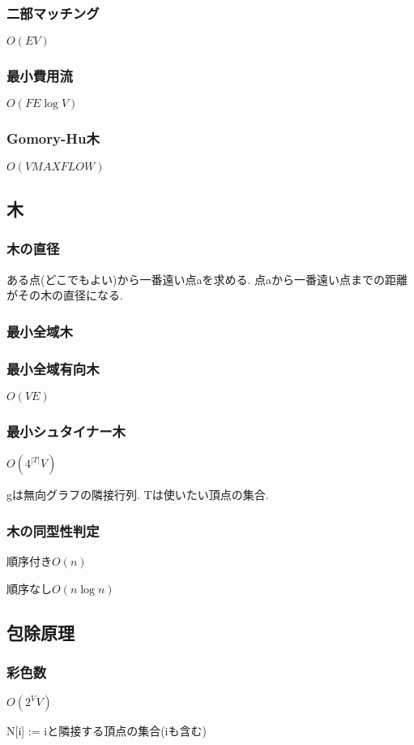 \subsubsection{二部マッチング}
$O(EV)$\par


\subsubsection{最小費用流}
$O(FE\log V)$\par


\subsubsection{Gomory-Hu木}
$O(V MAXFLOW)$


\subsection{木}
\subsubsection{木の直径}
ある点(どこでもよい)から一番遠い点aを求める. 点aから一番遠い点までの距離がその木の直径になる.\par
\subsubsection{最小全域木}

\subsubsection{最小全域有向木}
$O(VE)$

\subsubsection{最小シュタイナー木}
$O(4^{|T|}V)$ \par
gは無向グラフの隣接行列. Tは使いたい頂点の集合.\par

\subsubsection{木の同型性判定}
順序付き$O(n)$\par
順序なし$O(n\log n)$


\subsection{包除原理}
\subsubsection{彩色数}
$O(2^VV)$\par
N[i] := iと隣接する頂点の集合(iも含む)\par

